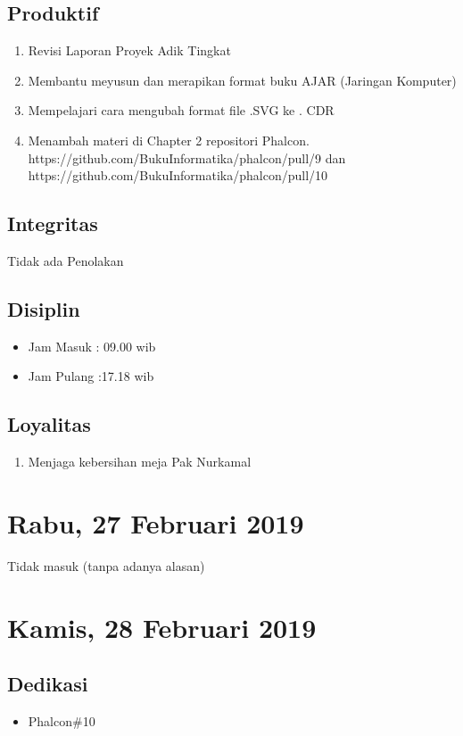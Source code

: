 \subsection{Produktif}
\begin{enumerate}
\item Revisi Laporan Proyek Adik Tingkat
\item Membantu meyusun dan merapikan format buku AJAR (Jaringan Komputer)
\item Mempelajari cara mengubah format file .SVG ke . CDR
\item Menambah materi di Chapter 2 repositori Phalcon.
\subitem https://github.com/BukuInformatika/phalcon/pull/9 dan https://github.com/BukuInformatika/phalcon/pull/10
\end{enumerate}
\subsection{Integritas}
Tidak ada Penolakan
\subsection{Disiplin}
\begin{itemize}
\item Jam Masuk : 09.00 wib
\item Jam Pulang :17.18 wib
\end{itemize}
\subsection{Loyalitas}
\begin{enumerate}
\item Menjaga kebersihan meja Pak Nurkamal
\end{enumerate}

\section{Rabu, 27 Februari 2019}
Tidak masuk (tanpa adanya alasan)

\section{Kamis, 28 Februari 2019}
\subsection{Dedikasi}
\begin{itemize}
\item Phalcon\#10
\end{itemize}
